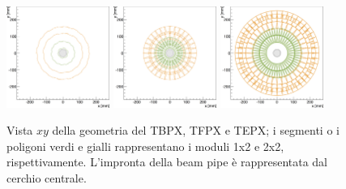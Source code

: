 \begin{figure}
\centering
\includegraphics[width=0.3\textwidth]{Immagini/ITxyTBPX_scaled}
\hfill
\includegraphics[width=0.3\textwidth]{Immagini/ITxyTFPX_scaled}
\hfill
\includegraphics[width=0.3\textwidth]{Immagini/ITxyTEPX}
\caption{Vista $xy$ della geometria del TBPX, TFPX e TEPX; i segmenti o i poligoni verdi e gialli rappresentano i moduli 1x2 e 2x2, rispettivamente. L'impronta della beam pipe \`e rappresentata dal cerchio centrale.}
\label{fig:ITxyView}
\end{figure}

